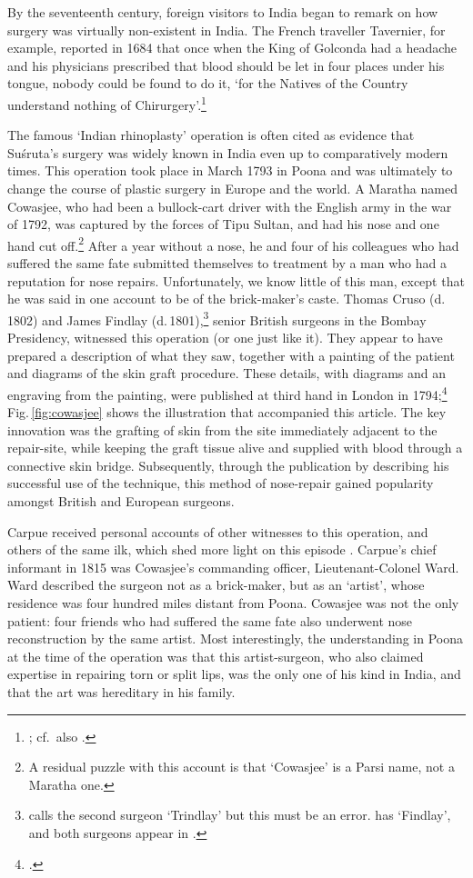 By the seventeenth century, foreign visitors to India began to remark on how
surgery was virtually non-existent in India. The French traveller
Tavernier\label{tavernier}, for example, reported in 1684 that once when the
King of Golconda had a headache and his physicians prescribed that
blood should be let in four places under his tongue, nobody could be found
to do it, `for the Natives of the Country understand nothing of
Chirurgery'.\footnote{\citet[1.2.103]{tave-trav}; cf.\ also
\citet[1.130]{slee-ramb}.}

The famous `Indian rhinoplasty' operation is often cited as
evidence that Suśruta's surgery was widely known in India even up
to comparatively modern times. This operation took place in March
1793 in Poona and was ultimately to change the course of plastic
surgery in Europe and the world. A Maratha named Cowasjee, who had
been a bullock-cart driver with the English army in the war of
1792, was captured by the forces of Tipu Sultan, and had his nose
and one hand cut off.\footnote{A residual puzzle with this account
is that `Cowasjee' is a Parsi name, not a Maratha one.} After a
year without a nose, he and four of his colleagues who had
suffered the same fate submitted themselves to treatment by a man
who had a reputation for nose repairs. Unfortunately, we know
little of this man, except that he was said in one account to be
of the brick-maker's caste. Thomas Cruso (d.\,1802) and James
Findlay (d.\,1801),\footnote{\citet{cowasjee} calls the second
surgeon `Trindlay' but this must be an error.
\citet[37]{carp-acco} has `Findlay', and both surgeons appear in
\citet[409, 411]{craw-roll}.} senior British surgeons in the
Bombay Presidency, witnessed this operation (or one just like it).
They appear to have prepared a description of what they saw,
together with a painting of the patient and diagrams of the skin
graft procedure.  These details, with diagrams and an engraving
from the painting, were published at third hand in London in
1794;\footnote{\citet[883, 891\,f.]{cowasjee}.}
Fig.\,\ref{fig:cowasjee} shows the illustration that accompanied
this article.  The key innovation was the grafting of skin from
the site immediately adjacent to the repair-site, while keeping
the graft tissue alive and supplied with blood through a
connective skin bridge. Subsequently, through the publication by
\citet{carp-acco} describing his successful use of the technique,
this method of nose-repair gained popularity amongst British and
European surgeons.

Carpue received personal accounts of other witnesses to this
operation, and others of the same ilk, which shed more light on
this episode \citep[appendix II]{carp-acco}.  Carpue's chief
informant in 1815 was Cowasjee's commanding officer,
Lieutenant-Colonel Ward.  Ward described the surgeon not as a
brick-maker, but as an `artist', whose residence was four hundred
miles distant from Poona. Cowasjee was not the only patient: four
friends who had suffered the same fate also underwent nose
reconstruction by the same artist. Most interestingly, the
understanding in Poona at the time of the operation was that this
artist-surgeon, who also claimed expertise in repairing torn or
split lips, was the only one of his kind in India, and that the
art was hereditary in his family.

